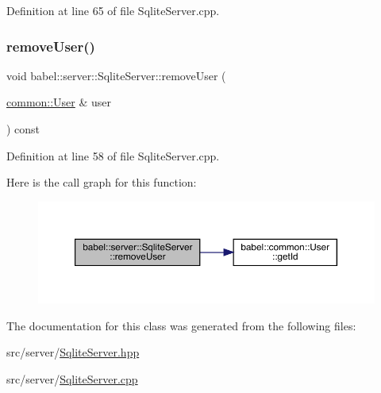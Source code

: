 Definition at line 65 of file Sqlite\+Server.\+cpp.

\mbox{\label{classbabel_1_1server_1_1_sqlite_server_ac7bc85e200004667440927de28502f22}} 
\subsubsection{\texorpdfstring{remove\+User()}{removeUser()}}
{\footnotesize\ttfamily void babel\+::server\+::\+Sqlite\+Server\+::remove\+User (\begin{DoxyParamCaption}\item[{\mbox{\hyperlink{classbabel_1_1common_1_1_user}{common\+::\+User}} \&}]{user }\end{DoxyParamCaption}) const}



Definition at line 58 of file Sqlite\+Server.\+cpp.

Here is the call graph for this function\+:\nopagebreak
\begin{figure}[H]
\begin{center}
\leavevmode
\includegraphics[width=350pt]{classbabel_1_1server_1_1_sqlite_server_ac7bc85e200004667440927de28502f22_cgraph}
\end{center}
\end{figure}


The documentation for this class was generated from the following files\+:\begin{DoxyCompactItemize}
\item 
src/server/\mbox{\hyperlink{_sqlite_server_8hpp}{Sqlite\+Server.\+hpp}}\item 
src/server/\mbox{\hyperlink{_sqlite_server_8cpp}{Sqlite\+Server.\+cpp}}\end{DoxyCompactItemize}
